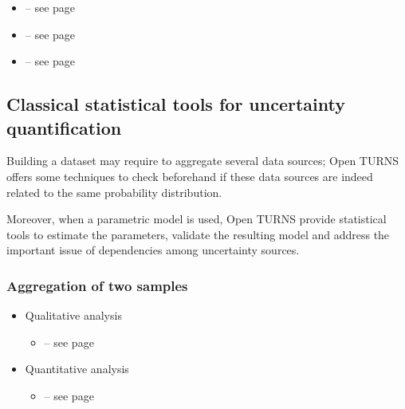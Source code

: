 \begin{itemize}

\item {}  -- see page \pageref{docref_B121_DistributionSelection} \vspace{2mm}
\item {}  -- see page \pageref{docref_B122_Copulas} \vspace{2mm}
\item {}  -- see page \pageref{docref_B122_RandomMixture} \vspace{2mm}

\end{itemize}

\subsection{Classical statistical tools for uncertainty quantification}

Building a dataset may require to aggregate several data sources; Open TURNS offers some techniques to check beforehand if these data sources are indeed related to the same probability distribution.

Moreover, when a parametric model is used, Open TURNS provide statistical tools to estimate the parameters, validate the resulting model and address the important issue of dependencies among uncertainty sources.

\subsubsection{Aggregation of two samples}

\begin{itemize}

\item Qualitative analysis
  \begin{itemize}
  \item {} -- see page \pageref{docref_B201_Graph}
  \end{itemize}
\item Quantitative analysis
  \begin{itemize}
  \item {} -- see page \pageref{docref_B202_Smirnov}
  \end{itemize}
\end{itemize}

